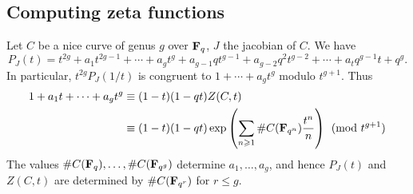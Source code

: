 \subsection{Computing zeta functions}

Let $C$ be a nice curve of genus $g$ over $\mathbf{F}_q$, $J$ the jacobian of $C$. We 
have 
\[
  P_J(t) = t^{2g} + a_1 t^{2g-1} + \cdots + a_g t^g + a_{g-1} q t^{g-1} + a_{g-2} q^2 t^{g-2} + \cdots + a_t q^{g-1} t + q^g \text{.}
\]
In particular, $t^{2g} P_J(1/t)$ is congruent to 
$1+\cdots + a_g t^g$ modulo $t^{g+1}$. Thus 
\begin{align*}
  1+ a_1 t + \cdots + a_g t^g &\equiv (1-t)(1-q t)Z(C,t) \\
    &\equiv (1-t)(1-q t)\exp\left(\sum_{n\geqslant 1} \# C(\mathbf{F}_{q^n}) \frac{t^n}{n}\right) \pmod{t^{g+1}}
\end{align*}
The values $\# C(\mathbf{F}_q),\dots,\# C(\mathbf{F}_{q^g})$ determine $a_1,\dots,a_g$, and 
hence $P_J(t)$ and $Z(C,t)$ are determined by 
$\# C(\mathbf{F}_{q^r})$ for $r\leqslant g$. 


